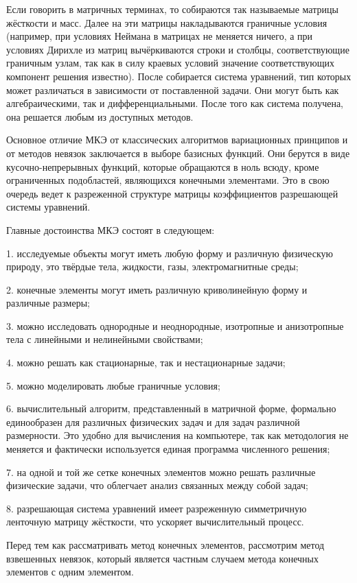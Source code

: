 \documentclass[14pt]{extreport}
\begin{document}
Если говорить в матричных терминах, то собираются так называемые матрицы жёсткости и масс. Далее на эти матрицы накладываются граничные условия (например, при условиях Неймана в матрицах не меняется ничего, а при условиях Дирихле из матриц вычёркиваются строки и столбцы, соответствующие граничным узлам, так как в силу краевых условий значение соответствующих компонент решения известно). После собирается система уравнений, тип которых может различаться в зависимости от поставленной задачи. Они могут быть как алгебраическими, так и дифференциальными. После того как система получена, она решается любым из доступных методов.

Основное отличие МКЭ от классических алгоритмов вариационных принципов и от методов невязок заключается в выборе базисных функций. Они берутся в виде кусочно-непрерывных функций, которые обращаются в ноль всюду, кроме ограниченных подобластей, являющихся конечными элементами. Это в свою очередь ведет к разреженной структуре матрицы коэффициентов разрешающей системы уравнений.

Главные достоинства МКЭ состоят в следующем:

1. исследуемые объекты могут иметь любую форму и различную физическую природу, это твёрдые тела, жидкости, газы, электромагнитные среды;

2. конечные элементы могут иметь различную криволинейную форму и различные размеры;

3. можно исследовать однородные и неоднородные, изотропные и анизотропные тела с линейными и нелинейными свойствами;

4. можно решать как стационарные, так и нестационарные задачи;

5. можно моделировать любые граничные условия;

6. вычислительный алгоритм, представленный в матричной форме, формально единообразен для различных физических задач и для задач различной размерности. Это удобно для вычисления на компьютере, так как методология не меняется и фактически используется единая программа численного решения;

7. на одной и той же сетке конечных элементов можно решать различные физические задачи, что облегчает анализ связанных между собой задач;

8. разрешающая система уравнений имеет разреженную симметричную ленточную матрицу жёсткости, что ускоряет вычислительный процесс.

Перед тем как рассматривать метод конечных элементов, рассмотрим метод взвешенных невязок, который является частным случаем метода конечных элементов с одним элементом.
\end{document}

